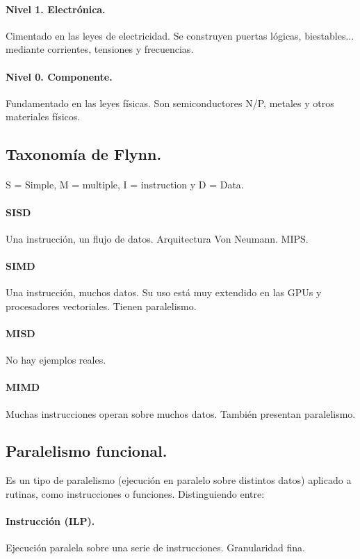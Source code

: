 \documentclass{article}
\begin{document}
\begin{multicols}{2}
		\paragraph{Nivel 1. Electrónica.}
		Cimentado en las leyes de electricidad. Se construyen puertas lógicas, biestables... mediante corrientes, tensiones y frecuencias.
		\paragraph{Nivel 0. Componente.}
		Fundamentado en las leyes físicas. Son semiconductores N/P, metales y otros materiales físicos.
		
		\subsection{Taxonomía de Flynn.}
		
		\paragraph{} 
		S = Simple, M = multiple, I = instruction y D = Data.
		\paragraph{SISD}
		Una instrucción, un flujo de datos. Arquitectura Von Neumann. MIPS.
		\paragraph{SIMD}
		Una instrucción, muchos datos. Su uso está muy extendido en las GPUs y procesadores vectoriales. Tienen paralelismo.
		\paragraph{MISD} 
		No hay ejemplos reales.
		\paragraph{MIMD} 
		Muchas instrucciones operan sobre muchos datos. También presentan paralelismo.

		\subsection{Paralelismo funcional.}
		
		Es un tipo de paralelismo (ejecución en paralelo sobre distintos datos) aplicado a rutinas, como instrucciones o funciones. Distinguiendo entre:
		\paragraph{Instrucción (ILP).}
		Ejecución paralela sobre una serie de instrucciones. Granularidad fina.

\end{multicols}
\end{document}
